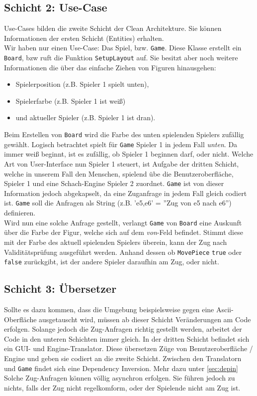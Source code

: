 \documentclass[
10pt, %
a4paper, %
oneside, %
headinclude,footinclude, %
BCOR5mm, %
]{scrartcl}
\begin{document}
\begin{onehalfspace}
\subsection{Schicht 2: Use-Case}
Use-Cases bilden die zweite Schicht der Clean Architekture. Sie können Informationen der ersten Schicht (Entities) erhalten.\\
Wir haben nur einen Use-Case: Das Spiel, bzw. \texttt{Game}. Diese Klasse erstellt ein \texttt{Board}, bzw ruft die Funktion \texttt{SetupLayout} auf. Sie besitzt aber noch weitere Informationen die über das einfache Ziehen von Figuren hinausgehen:
\begin{center}
	\begin{itemize}
		\item Spielerposition (z.B. Spieler 1 spielt unten),
		\item Spielerfarbe (z.B. Spieler 1 ist weiß)
		\item und aktueller Spieler (z.B. Spieler 1 ist dran).
	\end{itemize}
\end{center}
Beim Erstellen von \texttt{Board} wird die Farbe des unten spielenden Spielers zufällig gewählt. Logisch betrachtet spielt für \texttt{Game} Spieler 1 in jedem Fall \textit{unten}. Da immer weiß beginnt, ist es zufällig, ob Spieler 1 beginnen darf, oder nicht. Welche Art von User-Interface nun Spieler 1 steuert, ist Aufgabe der dritten Schicht, welche in unserem Fall den Menschen, spielend übe die Benutzeroberfläche, Spieler 1 und eine Schach-Engine Spieler 2 zuordnet. \texttt{Game} ist von dieser Information jedoch abgekapselt, da eine Zuganfrage in jedem Fall gleich codiert ist.
\texttt{Game} soll die Anfragen als String (z.B. 'e5,e6' = ''Zug von e5 nach e6'') definieren. \\
Wird nun eine solche Anfrage gestellt, verlangt \texttt{Game} von \texttt{Board} eine Auskunft über die Farbe der Figur, welche sich auf dem \textit{von}-Feld befindet. Stimmt diese mit der Farbe des aktuell spielenden Spielers überein, kann der Zug nach Validitätsprüfung ausgeführt werden. Anhand dessen ob \texttt{MovePiece} \texttt{true} oder \texttt{false} zurückgibt, ist der andere Spieler daraufhin am Zug, oder nicht.
\subsection{Schicht 3: Übersetzer}
Sollte es dazu kommen, dass die Umgebung beispielsweise gegen eine Ascii-Oberfläche ausgetauscht wird, müssen ab dieser Schicht Veränderungen am Code erfolgen. Solange jedoch die Zug-Anfragen richtig gestellt werden, arbeitet der Code in den unteren Schichten immer gleich. In der dritten Schicht befindet sich ein GUI- und Engine-Translator. Diese übersetzen Züge von Benutzeroberfläche / Engine und geben sie codiert an die zweite Schicht. Zwischen den Translatorn und \texttt{Game} findet sich eine Dependency Inversion. Mehr dazu unter \autoref{sec:depin}
Solche Zug-Anfragen können völlig asynchron erfolgen. Sie führen jedoch zu nichts, falls der Zug nicht regelkomform, oder der Spielende nicht am Zug ist.

\end{onehalfspace}
\end{document}
